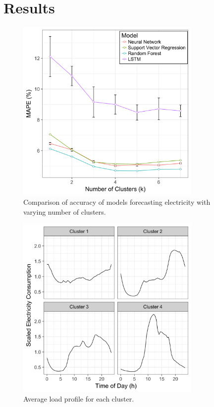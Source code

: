 \section{Results}


\begin{figure}
	\includegraphics[width=0.8\textwidth]{Chapter5/figures/results.png}
	\caption{Comparison of accuracy of models forecasting electricity with varying number of clusters.}
	\label{fig:results}
\end{figure}

\begin{figure}
	\includegraphics[width=0.8\textwidth]{Chapter5/figures/Cluster_Centres.png}
	\caption{Average load profile for each cluster.}
	\label{fig:clustercentre}
\end{figure}

